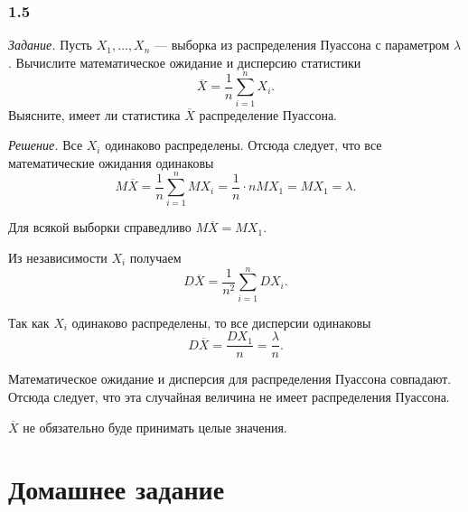 \subsubsection{1.5}

\textit{Задание.}
Пусть $X_1, \dotsc, X_n$ --- выборка из распределения Пуассона с параметром $ \lambda $.
Вычислите математическое ожидание и дисперсию статистики
$$ \overline{X} =
  \frac{1}{n} \sum \limits_{i = 1}^n X_i.$$
Выясните, имеет ли статистика $ \overline{X}$ распределение Пуассона.

\textit{Решение.} Все $X_i$ одинаково распределены.
Отсюда следует, что все математические ожидания одинаковы
$$M \overline{X} =
  \frac{1}{n} \sum \limits_{i = 1}^n MX_i =
  \frac{1}{n} \cdot nMX_1 =
  MX_1 =
  \lambda.$$

Для всякой выборки справедливо $M \overline{X} = MX_1$.

Из независимости $X_i$ получаем
$$D \overline{X} =
  \frac{1}{n^2} \sum \limits_{i = 1}^n DX_i.$$

Так как $X_i$ одинаково распределены, то все дисперсии одинаковы
$$D \overline{X} =
  \frac{DX_1}{n} =
  \frac{ \lambda }{n}.$$

Математическое ожидание и дисперсия для распределения Пуассона совпадают.
Отсюда следует, что эта случайная величина не имеет распределения Пуассона.

$ \overline{X}$ не обязательно буде принимать целые значения.

\section*{Домашнее задание}
